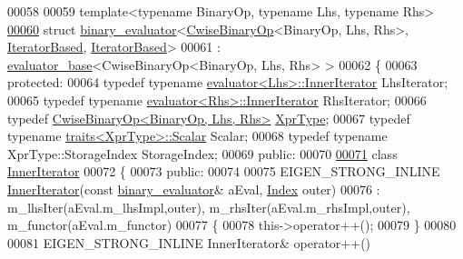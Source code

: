 \begin{DoxyCode}
00058 
00059 \textcolor{keyword}{template}<\textcolor{keyword}{typename} BinaryOp, \textcolor{keyword}{typename} Lhs, \textcolor{keyword}{typename} Rhs>
\hyperlink{struct_eigen_1_1internal_1_1binary__evaluator_3_01_cwise_binary_op_3_01_binary_op_00_01_lhs_00_05c4f9212bd4fb2e2b8664dee5123f03b}{00060} \textcolor{keyword}{struct }\hyperlink{struct_eigen_1_1internal_1_1binary__evaluator}{binary\_evaluator}<\hyperlink{group___core___module_class_eigen_1_1_cwise_binary_op}{CwiseBinaryOp}<BinaryOp, Lhs, Rhs>, 
      \hyperlink{struct_eigen_1_1internal_1_1_iterator_based}{IteratorBased}, \hyperlink{struct_eigen_1_1internal_1_1_iterator_based}{IteratorBased}>
00061   : \hyperlink{struct_eigen_1_1internal_1_1evaluator__base}{evaluator\_base}<CwiseBinaryOp<BinaryOp, Lhs, Rhs> >
00062 \{
00063 \textcolor{keyword}{protected}:
00064   \textcolor{keyword}{typedef} \textcolor{keyword}{typename} \hyperlink{struct_eigen_1_1internal_1_1evaluator}{evaluator<Lhs>::InnerIterator}  LhsIterator;
00065   \textcolor{keyword}{typedef} \textcolor{keyword}{typename} \hyperlink{struct_eigen_1_1internal_1_1evaluator}{evaluator<Rhs>::InnerIterator}  RhsIterator;
00066   \textcolor{keyword}{typedef} \hyperlink{group___core___module_class_eigen_1_1_cwise_binary_op}{CwiseBinaryOp<BinaryOp, Lhs, Rhs>} 
      \hyperlink{group___core___module_class_eigen_1_1_cwise_binary_op}{XprType};
00067   \textcolor{keyword}{typedef} \textcolor{keyword}{typename} \hyperlink{struct_eigen_1_1internal_1_1traits}{traits<XprType>::Scalar} Scalar;
00068   \textcolor{keyword}{typedef} \textcolor{keyword}{typename} XprType::StorageIndex StorageIndex;
00069 \textcolor{keyword}{public}:
00070 
\hyperlink{class_eigen_1_1internal_1_1binary__evaluator_3_01_cwise_binary_op_3_01_binary_op_00_01_lhs_00_01bbcbab6e07c6c8a44f9c2134b78b5906}{00071}   \textcolor{keyword}{class }\hyperlink{class_eigen_1_1_inner_iterator}{InnerIterator}
00072   \{
00073   \textcolor{keyword}{public}:
00074     
00075     EIGEN\_STRONG\_INLINE \hyperlink{class_eigen_1_1_inner_iterator}{InnerIterator}(\textcolor{keyword}{const} \hyperlink{struct_eigen_1_1internal_1_1binary__evaluator}{binary\_evaluator}& aEval, 
      \hyperlink{namespace_eigen_a62e77e0933482dafde8fe197d9a2cfde}{Index} outer)
00076       : m\_lhsIter(aEval.m\_lhsImpl,outer), m\_rhsIter(aEval.m\_rhsImpl,outer), m\_functor(aEval.m\_functor)
00077     \{
00078       this->operator++();
00079     \}
00080 
00081     EIGEN\_STRONG\_INLINE InnerIterator& operator++()

\end{DoxyCode}
